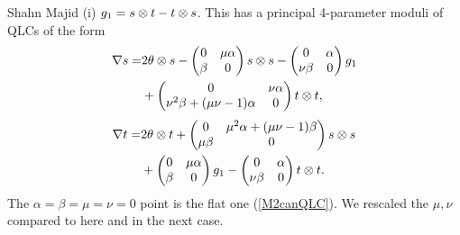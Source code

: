 \begin{artengenv}{Shahn Majid}
(i) $g_1=s\otimes t-t\otimes s$. This has a principal 4-parameter moduli of QLCs of the form
\begin{align*}
\nabla s=&2\theta\otimes s - \begin{pmatrix}0&\mu\alpha\\ \beta & 0\end{pmatrix}s\otimes s -\begin{pmatrix}0&\alpha\\ \nu\beta & 0\end{pmatrix}g_1\\
& +\begin{pmatrix}0&\nu\alpha\\ \nu^2\beta+(\mu\nu-1)\alpha & 0\end{pmatrix}t\otimes t,
\end{align*}
\begin{align*}
\nabla t=&2\theta\otimes t+\begin{pmatrix}0&\mu^2\alpha+(\mu\nu-1)\beta\\ \mu\beta & 0\end{pmatrix}s\otimes s\\
&+\begin{pmatrix}0&\mu\alpha\\ \beta & 0\end{pmatrix}g_1 - \begin{pmatrix}0&\alpha\\ \nu\beta & 0\end{pmatrix} t\otimes t.
\end{align*}
The $\alpha=\beta=\mu=\nu=0$ point is the flat one (\ref{M2canQLC}). We rescaled the $\mu,\nu$ compared to \parencite{BegMa} here and in the next case. 


\end{artengenv}
